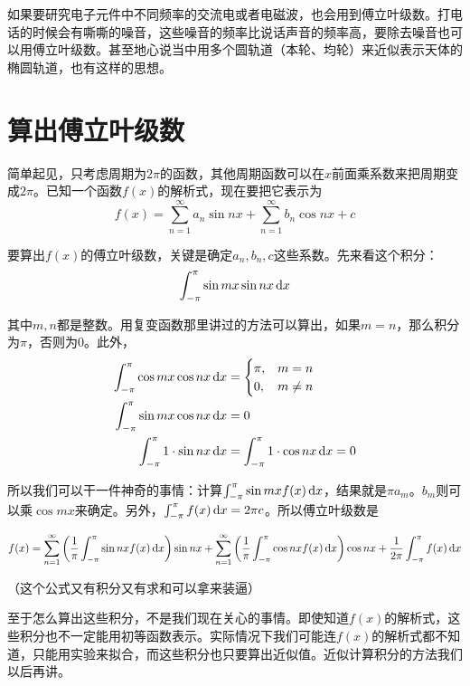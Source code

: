 如果要研究电子元件中不同频率的交流电或者电磁波，也会用到傅立叶级数。打电话的时候会有嘶嘶的噪音，这些噪音的频率比说话声音的频率高，要除去噪音也可以用傅立叶级数。甚至地心说当中用多个圆轨道（本轮、均轮）来近似表示天体的椭圆轨道，也有这样的思想。
\section{算出傅立叶级数}
简单起见，只考虑周期为$2 \pi$的函数，其他周期函数可以在$x$前面乘系数来把周期变成$2 \pi$。已知一个函数$f(x)$的解析式，现在要把它表示为
\begin{equation*}
f(x)=\sum_{n=1}^{\infty} a_n \sin n x+\sum_{n=1}^{\infty} b_n \cos n x+c
\end{equation*}

要算出$f(x)$的傅立叶级数，关键是确定$a_n,b_n,c$这些系数。先来看这个积分：
\begin{equation*}
\int_{-\pi}^{\pi} \sin m x \sin n x \mathop{}\!\mathrm{d} x
\end{equation*}

其中$m,n$都是整数。用复变函数那里讲过的方法可以算出，如果$m=n$，那么积分为$\pi$，否则为$0$。此外，
\begin{align*}
\int_{-\pi}^{\pi} \cos m x \cos n x \mathop{}\!\mathrm{d} x&=\begin{cases} \pi, &m=n \\ 0, &m \neq n \end{cases} \\
\int_{-\pi}^{\pi} \sin m x \cos n x \mathop{}\!\mathrm{d} x&=0 \\
\int_{-\pi}^{\pi} 1 \cdot \sin n x \mathop{}\!\mathrm{d} x&=\int_{-\pi}^{\pi} 1 \cdot \cos n x \mathop{}\!\mathrm{d} x=0
\end{align*}

所以我们可以干一件神奇的事情：计算$\int_{-\pi}^{\pi} \sin m x f(x) \mathop{}\!\mathrm{d} x$，结果就是$\pi a_m$。$b_m$则可以乘$\cos m x$来确定。另外，$\int_{-\pi}^{\pi} f(x) \mathop{}\!\mathrm{d} x=2 \pi c$。所以傅立叶级数是

\begin{equation*}
f(x)=\sum_{n=1}^{\infty} \left( \frac{1}{\pi} \int_{-\pi}^{\pi} \sin n x f(x) \mathop{}\!\mathrm{d} x \right) \sin n x+\sum_{n=1}^{\infty} \left( \frac{1}{\pi} \int_{-\pi}^{\pi} \cos n x f(x) \mathop{}\!\mathrm{d} x \right) \cos n x+\frac{1}{2 \pi} \int_{-\pi}^{\pi} f(x) \mathop{}\!\mathrm{d} x
\end{equation*}

（这个公式又有积分又有求和可以拿来装逼）

至于怎么算出这些积分，不是我们现在关心的事情。即使知道$f(x)$的解析式，这些积分也不一定能用初等函数表示。实际情况下我们可能连$f(x)$的解析式都不知道，只能用实验来拟合，而这些积分也只要算出近似值。近似计算积分的方法我们以后再讲。


